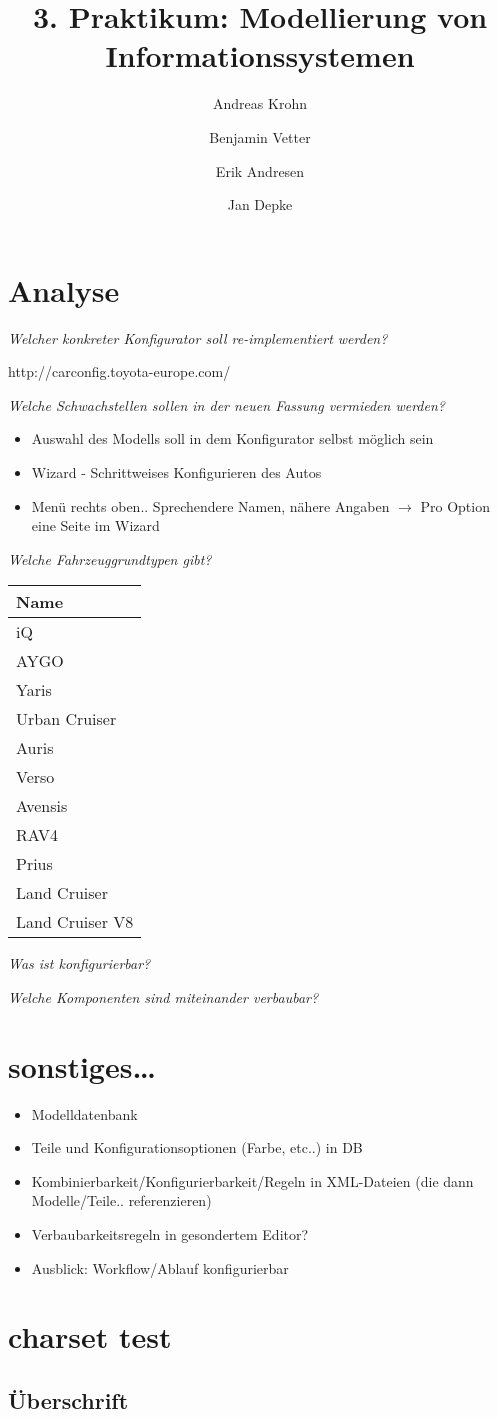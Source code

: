 \documentclass[a4paper,10pt]{article}
\title{3. Praktikum: Modellierung von Informationssystemen}
\author{Andreas Krohn \and Benjamin Vetter \and Erik Andresen \and Jan Depke}
\begin{document}
\maketitle

\tableofcontents

\section{Analyse}
\emph{Welcher konkreter Konfigurator soll re-implementiert werden?}

http://carconfig.toyota-europe.com/

\emph{Welche Schwachstellen sollen in der neuen Fassung vermieden werden?}

\begin{itemize}
 \item Auswahl des Modells soll in dem Konfigurator selbst möglich sein
 \item Wizard - Schrittweises Konfigurieren des Autos
 \item Menü rechts oben.. Sprechendere Namen, nähere Angaben $\rightarrow$ Pro Option eine Seite im Wizard
\end{itemize}

\emph{Welche Fahrzeuggrundtypen gibt?}

\begin{tabular}{|l|}
\hline
Name \\
\hline
iQ \\
AYGO \\
Yaris \\
Urban Cruiser \\
Auris \\
Verso \\
Avensis \\
RAV4 \\
Prius \\
Land Cruiser \\
Land Cruiser V8 \\
\hline
\end{tabular}

\emph{Was ist konfigurierbar?}

\emph{Welche Komponenten sind miteinander verbaubar?}



\section{sonstiges\ldots}
\begin{itemize}
 \item Modelldatenbank
 \item Teile und Konfigurationsoptionen (Farbe, etc..) in DB
 \item Kombinierbarkeit/Konfigurierbarkeit/Regeln in XML-Dateien (die dann Modelle/Teile.. referenzieren)
 \item Verbaubarkeitsregeln in gesondertem Editor?
 \item Ausblick: Workflow/Ablauf konfigurierbar
\end{itemize}

\section{charset test}
\subsection{Überschrift}
\end{document}
